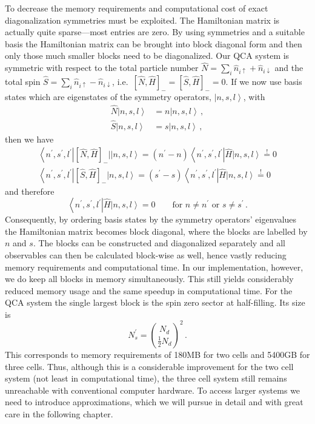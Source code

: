 \newcommand{\ket}[1]{\left|#1\right>}
\newcommand{\bra}[1]{\left<#1\right|}
%
To decrease the memory requirements and computational cost of
exact diagonalization symmetries must be exploited. The Hamiltonian matrix is
actually quite sparse---most entries are zero. By using symmetries and a
suitable basis the Hamiltonian matrix can be brought into block diagonal form
and then only those much smaller blocks need to be diagonalized. Our QCA system
is symmetric with respect to the total particle number $\hat{N} = \sum_i
\hat{n}_{i\uparrow} + \hat{n}_{i\downarrow}$ and the total spin $\hat{S} =
\sum_i \hat{n}_{i\uparrow} - \hat{n}_{i\downarrow}$, i.e.\ $[\hat{N},\hat{H}]_-
= [\hat{S},\hat{H}]_- = 0$. If we now use basis states which are eigenstates of
the symmetry operators, $\ket{n,s,l}$, with
%
\begin{equation}
\begin{split}
  \hat{N} \ket{n,s,l} &= n \ket{n,s,l} \, , \\
  \hat{S} \ket{n,s,l} &= s \ket{n,s,l} \, ,
\end{split}
\end{equation}
%
then we have
%
\begin{equation}
\begin{split}
  \bra{n^{\prime},s^{\prime},l^{\prime}} [\hat{N},\hat{H}]_- \ket{|n,s,l} = 
  (n^{\prime} - n) \bra{n^{\prime},s^{\prime},l^{\prime}} \hat{H} \ket{n,s,l}
  \stackrel{!}{=} 0 \\
  \bra{n^{\prime},s^{\prime},l^{\prime}} [\hat{S},\hat{H}]_- \ket{n,s,l} = 
  (s^{\prime} - s) \bra{n^{\prime},s^{\prime},l^{\prime}} \hat{H} \ket{n,s,l}
  \stackrel{!}{=} 0
\end{split}
\end{equation}
%
and therefore
%
\begin{equation}
  \bra{n^{\prime},s^{\prime},l^{\prime}} \hat{H} \ket{n,s,l} = 0 \qquad
  \textrm{for } n \ne n^{\prime} \textrm{ or } s \ne s^{\prime} \, .
\end{equation}
%
Consequently, by ordering basis states by the symmetry operators' eigenvalues
the Hamiltonian matrix becomes block diagonal, where the blocks are labelled by
$n$ and $s$. The blocks can be constructed and diagonalized separately and all
observables can then be calculated block-wise as well, hence vastly reducing
memory requirements and computational time. In our implementation, however, we
do keep all blocks in memory simultaneously. This still yields considerably
reduced memory usage and the same speedup in computational time. For the QCA system
the single largest block is the spin zero sector at half-filling. Its size is
%
\begin{equation}
  N_s^{\prime} = \binom{N_d}{\frac{1}{2} N_d}^2 \, .
\end{equation}
%
This corresponds to memory requirements of 180MB for two cells and 5400GB for
three cells. Thus, although this is a considerable improvement for the two cell
system (not least in computational time), the three cell system still remains
unreachable with conventional computer hardware. To access larger systems we
need to introduce approximations, which we will pursue in detail and with great
care in the following chapter.

